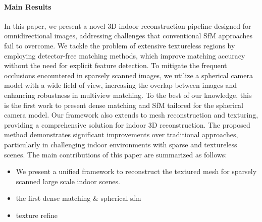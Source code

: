 \paragraph{Main Results}
In this paper, we present a novel 3D indoor reconstruction pipeline designed for omnidirectional images, addressing challenges that conventional SfM approaches fail to overcome.
We tackle the problem of extensive textureless regions by employing detector-free matching methods, which improve matching accuracy without the need for explicit feature detection. 
To mitigate the frequent occlusions encountered in sparsely scanned images, we utilize a spherical camera model with a wide field of view, increasing the overlap between images and enhancing robustness in multiview matching.
To the best of our knowledge, this is the first work to present dense matching and SfM tailored for the spherical camera model.
Our framework also extends to mesh reconstruction and texturing, providing a comprehensive solution for indoor 3D reconstruction. 
The proposed method demonstrates significant improvements over traditional approaches, particularly in challenging indoor environments with sparse and textureless scenes.
The main contributions of this paper are summarized as follows:
\begin{itemize}
    \item We present a unified framework to reconstruct the textured mesh for sparsely scanned large scale indoor scenes.
    \item the first dense matching \& spherical sfm
    \item texture refine
\end{itemize}
